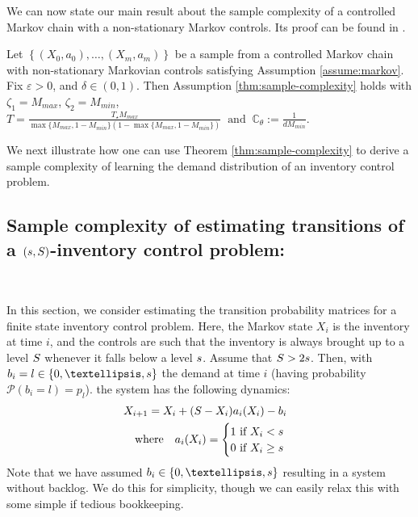 \documentclass[opre,sglanonrev]{informs4}
\newcommand{\harsha}[1]{\textcolor{red}{[Harsha: #1]}}
\numberwithin{equation}{section}
\newcommand{\pow}[1]{^{(#1)}}
\newcommand{\lp}{\left(}
\newcommand{\rp}{\right)}
\newcommand{\Cbb}{\mathbb{C}}
\newcommand{\Pbb}{\mathbb{P}}
\newcommand{\Kcal}{\mathcal{K}}
\newcommand{\Pcal}{\mathcal{P}}
\newcommand{\constant}{\Cbb}
\newcommand{\indexeddata}{\left\{(X_0,a_0),\dots,(X_m,a_m)\right\}}
\newcommand{\prob}{\Pbb}
\newcommand{\eps}{\varepsilon}
\renewcommand{\epsilon}{\eps}
\begin{document}
{{We can now state our main result about the sample complexity of a controlled Markov chain with a non-stationary Markov controls. Its proof can be found in .
\begin{proposition}\label{prop:markov-mdp}
Let $\indexeddata$ be a sample from a controlled Markov chain with non-stationary Markovian controls satisfying Assumption \ref{assume:markov}. Fix $\epsilon>0$, and $\delta \in (0,1)$. Then Assumption \ref{thm:sample-complexity} holds with $\zeta_1=M_{max}$, $\zeta_2=M_{min}$, $T=\frac{T_\star M_{max}}{\max\{M_{max},1-M_{min}\}(1-\max\{M_{max},1-M_{min}\})}\  \text{ and }\  \constant_{\theta}:= \frac{1}{dM_{min}}.$ 
\end{proposition}
We next illustrate how one can use Theorem \ref{thm:sample-complexity} to derive a sample complexity of learning the demand distribution of an inventory control problem. 


\subsection{Sample complexity of estimating transitions of a $(\texttt{\textbf{s}},\texttt{\textbf{S}})$-inventory  control problem:}~\label{sec:inventory-control}
{
In this section, we consider estimating the transition probability matrices 
for a finite state inventory control problem.
Here, the Markov state $X_i$ is the inventory at time $i$, and the controls are such that the inventory is always brought up to a  level $\texttt{\textbf{S}}$ whenever it falls below a level $\texttt{\textbf{s}}$. Assume that $\texttt{\textbf{S}}>2\texttt{\textbf{s}}$. Then, with $b_i = l\in\{0,\dots,\texttt{\textbf{s}}\}$ the demand at time $i$ (having
probability $\Pcal(b_i=l)=p_l$). the system has the following dynamics:
\begin{align*}
   & X_{i+1} = X_i + (\texttt{\textbf{S}}-X_i) a_i(X_i) - b_i
\\ 
&\quad \text{where} \quad  a_i(X_i) =   \begin{cases}
            1 \ \text{if} \ X_i<\texttt{\textbf{s}}\\
            0 \ \text{if} \ X_i\geq \texttt{\textbf{s}}
        \end{cases}
\end{align*}
Note that we have assumed $b_i\in\{0,\dots,\texttt{\textbf{s}}\}$ resulting in a system without backlog. We do this for simplicity, though we can easily relax this with some simple if tedious bookkeeping.

}}}
\end{document}
